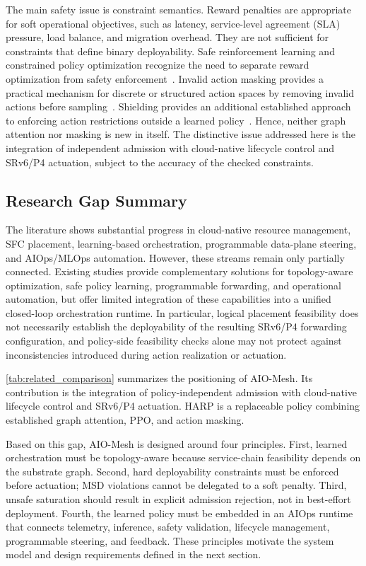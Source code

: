 \documentclass[final,5p]{elsarticle}
\newcommand{\rev}[1]{\textcolor{BrickRed}{#1}}
\begin{document}
The main safety issue is constraint semantics. Reward penalties are appropriate for soft operational objectives, such as latency, \rev{service-level agreement (SLA)} pressure, load balance, and migration overhead. They are not sufficient for constraints that define binary deployability. Safe reinforcement learning and constrained policy optimization recognize the need to separate reward optimization from safety enforcement~\cite{gu2024safe,ma2022conservative,wachi2024constraint}. Invalid action masking provides a practical mechanism for discrete or structured action spaces by removing invalid actions before sampling~\cite{huang2022closer}. \rev{Shielding provides an additional established approach to enforcing action restrictions outside a learned policy~\cite{alshiekh2018shielding}. Hence, neither graph attention nor masking is new in itself. The distinctive issue addressed here is the integration of independent admission with cloud-native lifecycle control and SRv6/P4 actuation, subject to the accuracy of the checked constraints.}

\subsection{Research Gap Summary}
\label{subsec:related_gap}
\sloppy
The literature shows substantial progress in cloud-native resource management, SFC placement, learning-based orchestration, programmable data-plane steering, and AIOps/MLOps automation. However, these streams remain only partially connected. \rev{Existing studies provide complementary solutions for topology-aware optimization, safe policy learning, programmable forwarding, and operational automation, but offer limited integration of these capabilities into a unified closed-loop orchestration runtime. In particular, logical placement feasibility does not necessarily establish the deployability of the resulting SRv6/P4 forwarding configuration, and policy-side feasibility checks alone may not protect against inconsistencies introduced during action realization or actuation.}

\autoref{tab:related_comparison} summarizes the positioning of AIO-Mesh. \rev{Its contribution is the integration of policy-independent admission with cloud-native lifecycle control and SRv6/P4 actuation. HARP is a replaceable policy combining established graph attention, PPO, and action masking.}

Based on this gap, AIO-Mesh is designed around four principles. First, learned orchestration must be topology-aware because service-chain feasibility depends on the substrate graph. Second, hard deployability constraints must be enforced before actuation; MSD violations cannot be delegated to a soft penalty. Third, unsafe saturation should result in explicit admission rejection, not in best-effort deployment. Fourth, the learned policy must be embedded in an AIOps runtime that connects telemetry, inference, safety validation, lifecycle management, programmable steering, and feedback. These principles motivate the system model and design requirements defined in the next section.
\end{document}
